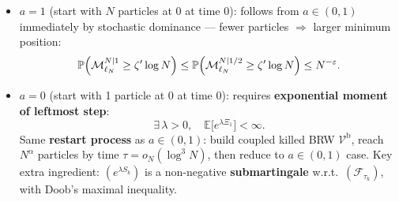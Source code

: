 \begin{itemize}
    \item \textbf{$a=1$} (start with $N$ particles at $0$ at time $0$): follows from $a\in(0,1)$ immediately by stochastic dominance --- fewer particles $\Rightarrow$ larger minimum position:
    \[
        \P\!\left(\mathcal M^{N|1}_{\ell_N}\ge\zeta'\log N\right)
        \le
        \P\!\left(\mathcal M^{N|1/2}_{\ell_N}\ge\zeta'\log N\right)
        \le N^{-\varepsilon}.
    \]
    \vspace{2mm}
    \item \textbf{$a=0$} (start with 1 particle at $0$ at time $0$): requires \textbf{exponential moment of leftmost step}:
    \[
        \exists\,\lambda>0,\quad \mathbb E\big[e^{\lambda\Xi_1}\big]<\infty.
    \]
    Same \textbf{restart process} as $a\in(0,1)$: build coupled killed BRW $\mathcal V^{\mathrm b}$, reach $N^\alpha$ particles by time $\tau=o_N(\log^3 N)$, then reduce to $a\in(0,1)$ case.
    Key extra ingredient: $(e^{\lambda S_k})$ is a non-negative \textbf{submartingale} w.r.t.\ $(\mathcal F_{\tau_k})$, with Doob's maximal inequality.
\end{itemize}
